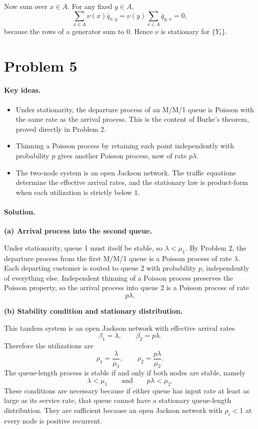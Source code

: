 \documentclass[11pt]{article}
\newcommand{\1}{\mathbf{1}}
\begin{document}
Now sum over \(x \in A\). For any fixed \(y \in A\),
\[
    \sum_{x \in A} \nu(x)\bar q_{x,y}
    =
    \nu(y)\sum_{x \in A}\bar q_{y,x}
    = 0,
\]
because the rows of a generator sum to \(0\). Hence \(\nu\) is stationary for \(\{Y_t\}\).

\section*{Problem 5}
\paragraph{Key ideas.}
\begin{itemize}
    \item Under stationarity, the departure process of an M/M/1 queue is Poisson with the same rate as the arrival process. This is the content of Burke's theorem, proved directly in Problem 2.
    \item Thinning a Poisson process by retaining each point independently with probability \(p\) gives another Poisson process, now of rate \(p\lambda\).
    \item The two-node system is an open Jackson network. The traffic equations determine the effective arrival rates, and the stationary law is product-form when each utilization is strictly below \(1\).
\end{itemize}

\paragraph{Solution.}
\textbf{(a) Arrival process into the second queue.}

Under stationarity, queue 1 must itself be stable, so \(\lambda<\mu_1\). By Problem 2, the departure process from the first M/M/1 queue is a Poisson process of rate \(\lambda\). Each departing customer is routed to queue 2 with probability \(p\), independently of everything else. Independent thinning of a Poisson process preserves the Poisson property, so the arrival process into queue 2 is a Poisson process of rate
\[
    p\lambda.
\]

\textbf{(b) Stability condition and stationary distribution.}

This tandem system is an open Jackson network with effective arrival rates
\[
    \beta_1 = \lambda,
    \qquad
    \beta_2 = p\lambda.
\]
Therefore the utilizations are
\[
    \rho_1 = \frac{\lambda}{\mu_1},
    \qquad
    \rho_2 = \frac{p\lambda}{\mu_2}.
\]
The queue-length process is stable if and only if both nodes are stable, namely
\[
    \lambda < \mu_1
    \qquad\text{and}\qquad
    p\lambda < \mu_2.
\]
These conditions are necessary because if either queue has input rate at least as large as its service rate, that queue cannot have a stationary queue-length distribution. They are sufficient because an open Jackson network with \(\rho_i<1\) at every node is positive recurrent.
\end{document}
